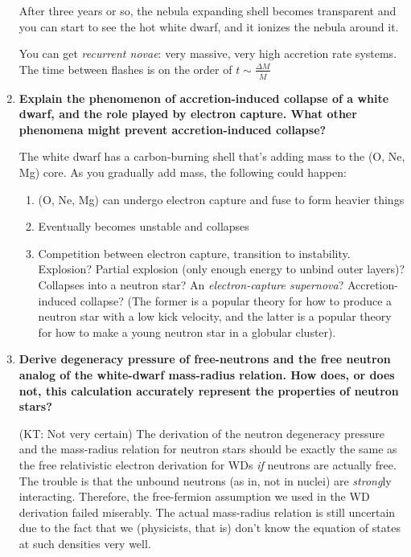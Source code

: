 \documentclass[a4paper]{article}
\begin{document}
\begin{enumerate}
After three years or so, the nebula expanding shell becomes transparent and you can start to see the hot white dwarf, and it ionizes the nebula around it. 

You can get \emph{recurrent novae}: very massive, very high accretion rate systems. The time between flashes is on the order of $ t \sim \frac{\Delta M}{\dot{M}} $

\item \textbf{Explain the phenomenon of accretion-induced collapse of a white dwarf, and the role played by electron capture. What other phenomena might prevent accretion-induced collapse?}

The white dwarf has a carbon-burning shell that's adding mass to the (O, Ne, Mg) core. As you gradually add mass, the following could happen:

\begin{enumerate}
\item (O, Ne, Mg) can undergo electron capture and fuse to form heavier things
\item Eventually becomes unstable and collapses
\item Competition between electron capture, transition to instability. Explosion? Partial explosion (only enough energy to unbind outer layers)? Collapses into a neutron star? An \emph{electron-capture supernova}? Accretion-induced collapse? (The former is a popular theory for how to produce a neutron star with a low kick velocity, and the latter is a popular theory for how to make a young neutron star in a globular cluster). 
\end{enumerate}

\item \textbf{Derive degeneracy pressure of free-neutrons and the free neutron analog of the white-dwarf mass-radius relation. How does, or does not, this calculation accurately represent the properties of neutron stars?}

(KT: Not very certain)
The derivation of the neutron degeneracy pressure and the mass-radius relation for neutron stars should be exactly the same as the free relativistic electron derivation for WDs \textit{if} neutrons are actually free. The trouble is that the unbound neutrons (as in, not in nuclei) are \textit{strong}ly interacting. Therefore, the free-fermion assumption we used in the WD derivation failed miserably. The actual mass-radius relation is still uncertain due to the fact that we (physicists, that is) don't know the equation of states at such densities very well.  


\end{enumerate}
\end{document}
